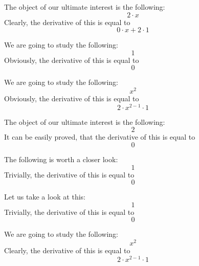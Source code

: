 \documentclass{article}
\begin{document}
The object of our ultimate interest is the following:
\begin{equation}
2 \cdot x 
\end{equation}
Clearly, the derivative of this is equal to
\begin{equation}
0 \cdot x + 2 \cdot 1 
\end{equation}

We are going to study the following:
\begin{equation}
1 
\end{equation}
Obviously, the derivative of this is equal to
\begin{equation}
0 
\end{equation}

We are going to study the following:
\begin{equation}
x ^{2 } 
\end{equation}
Obviously, the derivative of this is equal to
\begin{equation}
2 \cdot x ^{2 - 1 } \cdot 1 
\end{equation}

The object of our ultimate interest is the following:
\begin{equation}
2 
\end{equation}
It can be easily proved, that the derivative of this is equal to
\begin{equation}
0 
\end{equation}

The following is worth a closer look:
\begin{equation}
1 
\end{equation}
Trivially, the derivative of this is equal to
\begin{equation}
0 
\end{equation}

Let us take a look at this:
\begin{equation}
1 
\end{equation}
Trivially, the derivative of this is equal to
\begin{equation}
0 
\end{equation}

We are going to study the following:
\begin{equation}
x ^{2 } 
\end{equation}
Clearly, the derivative of this is equal to
\begin{equation}
2 \cdot x ^{2 - 1 } \cdot 1 
\end{equation}
\end{document}
